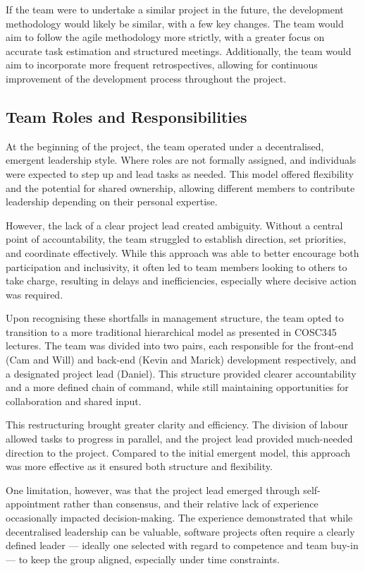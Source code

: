 \documentclass[conference]{IEEEtran}
\begin{document}
If the team were to undertake a similar project in the future, the development methodology would likely be similar, with a few key changes. The team would aim to follow the agile methodology more strictly, with a greater focus on accurate task estimation and structured meetings. Additionally, the team would aim to incorporate more frequent retrospectives, allowing for continuous improvement of the development process throughout the project.

\subsection{Team Roles and Responsibilities}
At the beginning of the project, the team operated under a decentralised, emergent leadership style. Where roles are not formally assigned, and individuals were expected to step up and lead tasks as needed. This model offered flexibility and the potential for shared ownership, allowing different members to contribute leadership depending on their personal expertise.

However, the lack of a clear project lead created ambiguity. Without a central point of accountability, the team struggled to establish direction, set priorities, and coordinate effectively. While this approach was able to better encourage both participation and inclusivity, it often led to team members looking to others to take charge, resulting in delays and inefficiencies, especially where decisive action was required.

Upon recognising these shortfalls in management structure, the team opted to transition to a more traditional hierarchical model as presented in COSC345 lectures. The team was divided into two pairs, each responsible for the front-end (Cam and Will) and back-end (Kevin and Marick) development  respectively, and a designated project lead (Daniel). This structure provided clearer accountability and a more defined chain of command, while still maintaining opportunities for collaboration and shared input.

This restructuring brought greater clarity and efficiency. The division of labour allowed tasks to progress in parallel, and the project lead provided much-needed direction to the project. Compared to the initial emergent model, this approach was more effective as it ensured both structure and flexibility. 

One limitation, however, was that the project lead emerged through self-appointment rather than consensus, and their relative lack of experience occasionally impacted decision-making. The experience demonstrated that while decentralised leadership can be valuable, software projects often require a clearly defined leader — ideally one selected with regard to competence and team buy-in — to keep the group aligned, especially under time constraints.
\end{document}
